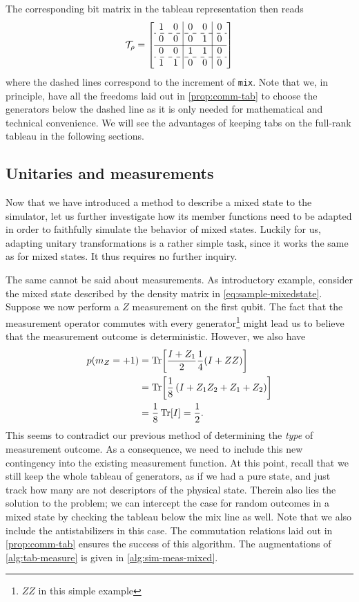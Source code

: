 The corresponding bit matrix in the tableau representation then reads
\begin{align}
\mathcal{T}_{\rho} = 
  \left[
    \begin{array}{cc|cc|c}
      1 & 0 & 0 & 0 & 0 \\ \hdashline
      0 & 0 & 0 & 1 & 0 \\ \hline
      0 & 0 & 1 & 1 & 0 \\ \hdashline
      1 & 1 & 0 & 0 & 0 \\ 
    \end{array}
  \right]
\end{align}
where the dashed lines correspond to the increment of \verb|mix|. Note that we,
in principle, have all the freedoms laid out in \cref{prop:comm-tab} to choose
the generators below the dashed line as it is only needed for mathematical and
technical convenience. We will see the advantages of keeping tabs on the
full-rank tableau in the following sections.

\subsection{Unitaries and measurements}
Now that we have introduced a method to describe a mixed state to the
simulator, let us further investigate how its member functions need to be
adapted in order to faithfully simulate the behavior of mixed states. Luckily
for us, adapting unitary transformations is a rather simple task, since it
works the same as for mixed states. It thus requires no further inquiry. 

The same cannot be said about measurements. As introductory example, consider
the mixed state described by the density matrix in \cref{eq:sample-mixedstate}.
Suppose we now perform a $Z$ measurement on the first qubit. The fact that the
measurement operator commutes with every generator\footnote{$ZZ$ in this simple
example} might lead us to believe that the measurement outcome is
deterministic. However, we also have
\begin{align}
  p(m_Z = +1) &= \Tr[\frac{I+Z_1}{2} \frac{1}{4} (I+ZZ)] \nonumber \\
              &= \Tr[\frac{1}{8}\left(I + Z_1Z_2 + Z_1 + Z_2  \right)] \nonumber \\
              &= \frac{1}{8} \Tr[I] = \frac{1}{2}
.\end{align}
This seems to contradict our previous method of determining the \emph{type} of
measurement outcome. As a consequence, we need to include this new contingency
into the existing measurement function. At this point, recall that we still
keep the whole tableau of generators, as if we had a pure state, and just track
how many are not descriptors of the physical state. Therein also lies the
solution to the problem; we can intercept the case for random outcomes in a
mixed state by checking the tableau below the mix line as well. Note that we
also include the antistabilizers in this case. The commutation relations laid
out in \cref{prop:comm-tab} ensures the success of this algorithm. The
augmentations of \cref{alg:tab-measure} is given in \cref{alg:sim-meas-mixed}.

